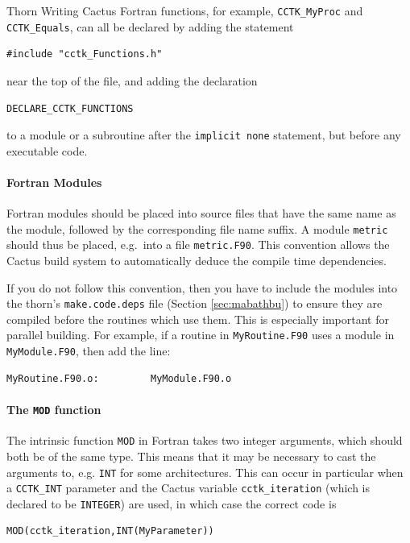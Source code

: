 \begin{cactuspart}{Thorn Writing}
Cactus Fortran functions, for example, \texttt{CCTK\_MyProc} and {\tt
CCTK\_Equals}, can all be declared by adding the statement
%
\begin{verbatim}
#include "cctk_Functions.h"
\end{verbatim}
%
near the top of the file, and adding the declaration
%
\begin{verbatim}
DECLARE_CCTK_FUNCTIONS
\end{verbatim}
%
to a module or a subroutine after the \texttt{implicit none}
statement, but before any executable code.

\paragraph{Fortran Modules}
\label{par:fortran_modules}

Fortran modules should be placed into source files that have the same
name as the module, followed by the corresponding file name suffix.  A
module \texttt{metric} should thus be placed, e.g.\ into a file
\texttt{metric.F90}.  This convention allows the Cactus build system
to automatically deduce the compile time dependencies.

If you do not follow this convention, then you have to include the
modules into the thorn's \texttt{make.code.deps} file
(Section \ref{sec:mabathbu}) to ensure they are compiled before the routines
which use them.  This is especially important for parallel building.
For example, if a routine in \texttt{MyRoutine.F90} uses a module in {\tt
MyModule.F90}, then add the line:
%
\begin{verbatim}
MyRoutine.F90.o:         MyModule.F90.o
\end{verbatim}

\paragraph{The \texttt{MOD} function}

The intrinsic function \texttt{MOD} in Fortran takes two integer
arguments, which should both be of the same type. This means
that it may be necessary to cast the arguments to, e.g.
\texttt{INT} for some architectures. This can occur in particular
when a \texttt{CCTK\_INT} parameter and the Cactus variable \texttt{cctk\_iteration}
(which is declared to be \texttt{INTEGER}) are used,
in which case the correct code is
\begin{verbatim}
MOD(cctk_iteration,INT(MyParameter))
\end{verbatim}



\end{cactuspart}
